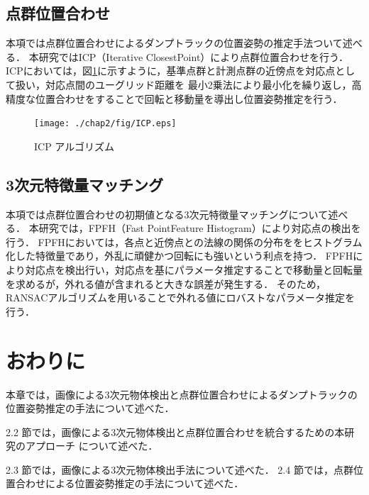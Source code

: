 \subsection{点群位置合わせ}
本項では点群位置合わせによるダンプトラックの位置姿勢の推定手法ついて述べる．
本研究ではICP（Iterative ClosestPoint）\cite{Chetverikov2002}により点群位置合わせを行う．
ICPにおいては，図\ref{fig:icp}に示すように，基準点群と計測点群の近傍点を対応点として扱い，対応点間のユーグリッド距離を
最小2乗法により最小化を繰り返し，高精度な位置合わせをすることで回転と移動量を導出し位置姿勢推定を行う．
\begin{figure}[b]
    \begin{center}
    \texttt{[image: ./chap2/fig/ICP.eps]}
    \caption{ICP アルゴリズム}
    \label{fig:icp}
    \end{center}
\end{figure}


\newpage

\subsection{3次元特徴量マッチング}
本項では点群位置合わせの初期値となる3次元特徴量マッチングについて述べる．
本研究では，FPFH（Fast PointFeature Histogram）\cite{Rusu2009}により対応点の検出を行う．
FPFHにおいては，各点と近傍点との法線の関係の分布ををヒストグラム化した特徴量であり，外乱に頑健かつ回転にも強いという利点を持つ．
FPFHにより対応点を検出行い，対応点を基にパラメータ推定することで移動量と回転量を求めるが，外れる値が含まれると大きな誤差が発生する．
そのため，RANSACアルゴリズムを用いることで外れる値にロバストなパラメータ推定を行う．

\newpage

\section{おわりに}
本章では，画像による3次元物体検出と点群位置合わせによるダンプトラックの位置姿勢推定の手法について述べた．
\par
2.2 節では，画像による3次元物体検出と点群位置合わせを統合するための本研究のアプローチ
について述べた．
\par
2.3 節では，画像による3次元物体検出手法について述べた．
2.4 節では，点群位置合わせによる位置姿勢推定の手法について述べた．

\newpage
